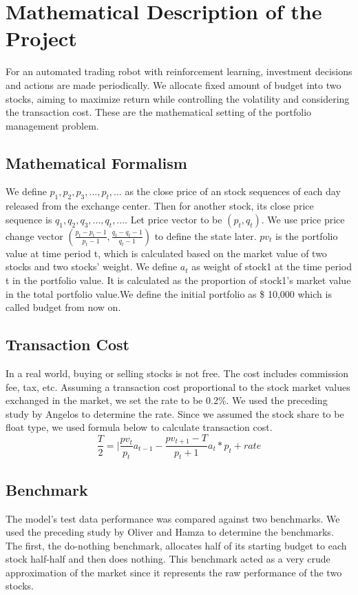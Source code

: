 \chapter{Mathematical Description of the Project}
\label{Ch:mathematical description}
For an automated trading robot with reinforcement learning, investment decisions and actions are made periodically. We allocate fixed amount of budget into two stocks, aiming to maximize return while controlling the volatility and considering the transaction cost. These are the mathematical setting of the portfolio management problem.

\section{Mathematical Formalism}
We define $p_1,p_2,p_3,...,p_t,...$ as the close price of an stock sequences of each day released from the exchange center. Then for another stock, its close price sequence is $q_1,q_2,q_3,...,q_t,...$. Let price vector to be $(p_t, q_t)$. We use price price change vector $(\frac{p_t-p_t-1}{p_t-1},\frac{q_t-q_t-1}{q_t-1})$ to define the state later.
$pv_t$ is the portfolio value at time period t, which is calculated based on the market value of two stocks and two stocks' weight. We define $a_t$ as weight of stock1 at the time period t in the portfolio value. It is calculated as the proportion of stock1's market value in the total portfolio value.We define the initial portfolio as \$ 10,000 which is called budget from now on.



\section{Transaction Cost}
In a real world, buying or selling stocks is not free. The cost includes commission fee, tax, etc. Assuming a transaction cost proportional to the stock market values exchanged in the market, we set the rate to be 0.2\%. We used the preceding study by Angelos to determine the rate. Since we assumed the stock share to be float type, we used formula below to calculate transaction cost. 
$$\frac{T}{2} = |\frac{pv_t}{p_t}a_{t-1} - \frac{pv_{t+1}-T}{p_t+1}a_t*p_t+rate$$


\section{Benchmark}
The model’s test data performance was compared against two benchmarks. We used the preceding study by Oliver and Hamza to determine the benchmarks. The first, the do-nothing benchmark, allocates half of its starting budget to each stock half-half and then does nothing. This benchmark acted as a very crude approximation of the market since it represents the raw performance of the two stocks.

